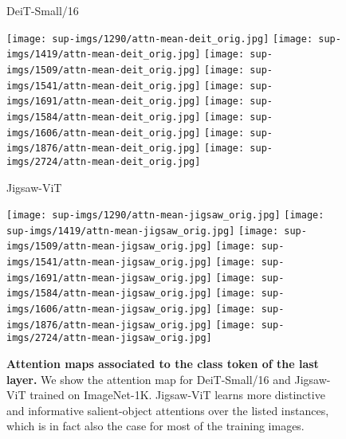 \documentclass{article}
\begin{document}
\begin{figure*}[ht]
\begin{minipage}{0.1\textwidth}
		\centering
		\footnotesize{DeiT-Small/16}
		\end{minipage}\hfill
		\begin{minipage}{0.9\textwidth}
		\centering
		\texttt{[image: sup-imgs/1290/attn-mean-deit\_orig.jpg]}
		\texttt{[image: sup-imgs/1419/attn-mean-deit\_orig.jpg]}
		\texttt{[image: sup-imgs/1509/attn-mean-deit\_orig.jpg]}
		\texttt{[image: sup-imgs/1541/attn-mean-deit\_orig.jpg]}
		\texttt{[image: sup-imgs/1691/attn-mean-deit\_orig.jpg]}
		\texttt{[image: sup-imgs/1584/attn-mean-deit\_orig.jpg]}
		\texttt{[image: sup-imgs/1606/attn-mean-deit\_orig.jpg]}
		\texttt{[image: sup-imgs/1876/attn-mean-deit\_orig.jpg]}
		\texttt{[image: sup-imgs/2724/attn-mean-deit\_orig.jpg]}
		\end{minipage}\hfill
		\begin{minipage}{0.1\textwidth}
		\centering
		\footnotesize{Jigsaw-ViT}
		\end{minipage}\hfill
		\begin{minipage}{0.9\textwidth}
		\centering
		\texttt{[image: sup-imgs/1290/attn-mean-jigsaw\_orig.jpg]}
		\texttt{[image: sup-imgs/1419/attn-mean-jigsaw\_orig.jpg]}
		\texttt{[image: sup-imgs/1509/attn-mean-jigsaw\_orig.jpg]}
		\texttt{[image: sup-imgs/1541/attn-mean-jigsaw\_orig.jpg]}
		\texttt{[image: sup-imgs/1691/attn-mean-jigsaw\_orig.jpg]}
		\texttt{[image: sup-imgs/1584/attn-mean-jigsaw\_orig.jpg]}
		\texttt{[image: sup-imgs/1606/attn-mean-jigsaw\_orig.jpg]}
		\texttt{[image: sup-imgs/1876/attn-mean-jigsaw\_orig.jpg]}
		\texttt{[image: sup-imgs/2724/attn-mean-jigsaw\_orig.jpg]}
	\end{minipage}
	\caption{{\bf Attention maps associated to the class token of the last layer.} We show the attention map for DeiT-Small/16 and Jigsaw-ViT trained on ImageNet-1K. Jigsaw-ViT learns more distinctive and informative salient-object attentions over the listed instances, which is in fact also the case for most of the training images.}
    \label{fig::supp-attention}
\end{figure*}
\end{document}
